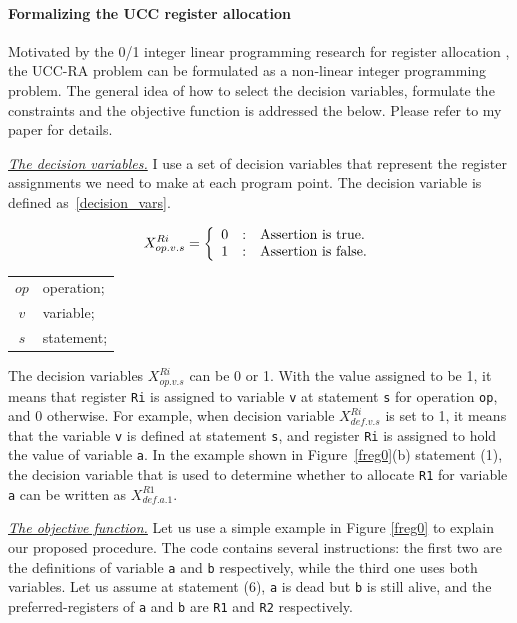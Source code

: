 \paragraph{Formalizing the UCC register allocation}
Motivated by the 0/1 integer linear programming research for register allocation \cite{related:ilp}, the UCC-RA problem can be formulated as a non-linear integer programming problem. The general idea of how to select the decision variables, formulate the constraints and the objective function is addressed the below. Please refer to my paper \cite{ucc} for details.

{\underline{\em The decision variables.}} 
I use a set of decision variables that represent the register assignments we need to make at each program point. The decision variable is defined as~\ref{decision_vars}. 

\begin{small}
\begin{eqnarray}
X_{op.v.s}^{Ri} = \left\{\begin{array}{r@{\quad:\quad}l}
0  & \mbox{Assertion is true.}\\
1  & \mbox{Assertion is false.}
\label{decision_vars}
\end{array}\right.    
\end{eqnarray}

\begin{center}
\begin{tabular}{c|p{2.0in}} 
$op$ & operation;\\
$v$ &  variable;\\
$s$ & statement; \\
\end{tabular}
\end{center}
\end{small}

The decision variables $X_{op.v.s}^{Ri}$ can be 0 or 1.
With the value assigned to be 1, it means that register {\tt Ri} is assigned to variable {\tt v} at statement {\tt s} for operation {\tt op}, and 0 otherwise. For example, when decision variable $X_{def.v.s}^{Ri}$ is set to 1, it means that the variable {\tt v} is defined at statement {\tt s}, and  register {\tt Ri} is assigned to hold the value of variable {\tt a}. 
In the example shown in Figure~\ref{freg0}(b) statement (1), the decision variable that is used to determine whether
to allocate {\tt R1} for variable {\tt a} can be written as $X_{def.a.1}^{R1}$.

{\underline{\em The objective function.}}
Let us use a simple example in Figure \ref{freg0} to explain our proposed procedure. The code contains several instructions: the first two are the definitions of variable {\tt a} and {\tt b} respectively, while the third one uses both variables. Let us assume at statement (6), {\tt a} is dead but {\tt b} is still alive, and the preferred-registers of {\tt a} and {\tt b} are {\tt R1} and {\tt R2} respectively.


